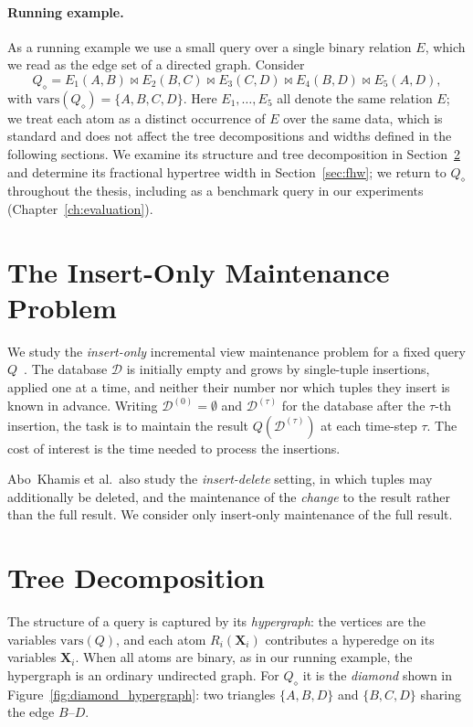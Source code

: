 \paragraph{Running example.}
As a running example we use a small query over a single binary relation $E$, which we read as the edge set of a directed graph.
Consider
\[
Q_\diamond = E_1(A,B) \bowtie E_2(B,C) \bowtie E_3(C,D) \bowtie E_4(B,D) \bowtie E_5(A,D),
\]
with $\mathrm{vars}(Q_\diamond) = \{A,B,C,D\}$.
Here $E_1,\dots,E_5$ all denote the same relation $E$; we treat each atom as a distinct occurrence of $E$ over the same data, which is standard and does not affect the tree decompositions and widths defined in the following sections.
We examine its structure and tree decomposition in Section~\ref{sec:tree_decompositions} and determine its fractional hypertree width in Section~\ref{sec:fhw}; we return to $Q_\diamond$ throughout the thesis, including as a benchmark query in our experiments (Chapter~\ref{ch:evaluation}).

\section{The Insert-Only Maintenance Problem}
\label{sec:ivm_problem}

We study the \emph{insert-only} incremental view maintenance problem for a fixed query $Q$~\cite{abokhamis2024Insert-Only}.
The database $\mathcal{D}$ is initially empty and grows by single-tuple insertions, applied one at a time, and neither their number nor which tuples they insert is known in advance.
Writing $\mathcal{D}^{(0)} = \emptyset$ and $\mathcal{D}^{(\tau)}$ for the database after the $\tau$-th insertion, the task is to maintain the result $Q(\mathcal{D}^{(\tau)})$ at each time-step $\tau$.
The cost of interest is the time needed to process the insertions.

Abo~Khamis et al.\ also study the \emph{insert-delete} setting, in which tuples may additionally be deleted, and the maintenance of the \emph{change} to the result rather than the full result. We consider only insert-only maintenance of the full result.

\section{Tree Decomposition}
\label{sec:tree_decompositions}

The structure of a query is captured by its \emph{hypergraph}: the vertices are the variables $\mathrm{vars}(Q)$, and each atom $R_i(\mathbf{X}_i)$ contributes a hyperedge on its variables $\mathbf{X}_i$.
When all atoms are binary, as in our running example, the hypergraph is an ordinary undirected graph.
For $Q_\diamond$ it is the \emph{diamond} shown in Figure~\ref{fig:diamond_hypergraph}: two triangles $\{A,B,D\}$ and $\{B,C,D\}$ sharing the edge $B\text{--}D$.

